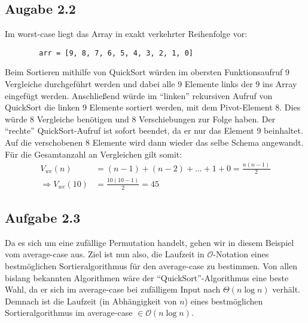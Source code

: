 \documentclass{article}
\begin{document}
    \subsection*{Augabe 2.2}
    Im worst-case liegt das Array in exakt verkehrter Reihenfolge vor:
    \begin{lstlisting}
        arr = [9, 8, 7, 6, 5, 4, 3, 2, 1, 0]
    \end{lstlisting}
    Beim Sortieren mithilfe von QuickSort würden im obersten Funktionsaufruf 9 Vergleiche durchgeführt werden und dabei alle 9 Elemente links der 9 ins Array eingefügt werden. Anschließend würde im "`linken"' rekursiven Aufruf von QuickSort die linken 9 Elemente sortiert werden, mit dem Pivot-Element 8. Dies würde 8 Vergleiche benötigen und 8 Verschiebungen zur Folge haben. Der "`rechte"' QuickSort-Aufruf ist sofort beendet, da er nur das Element 9 beinhaltet. Auf die verschobenen 8 Elemente wird dann wieder das selbe Schema angewandt. Für die Gesamtanzahl an Vergleichen gilt somit:
    \begin{align*}
        V_{wc}(n) &= (n-1) + (n-2) + ... + 1 + 0 = \frac{n(n-1)}{2}\\
        \Rightarrow V_{wc}(10) &= \frac{10(10-1)}{2} = 45
    \end{align*}


    \subsection*{Aufgabe 2.3}
    Da es sich um eine zufällige Permutation handelt, gehen wir in diesem Beispiel vom average-case aus. Ziel ist nun also, die Laufzeit in $\mathcal{O}$-Notation eines bestmöglichen Sortieralgorithmus für den average-case zu bestimmen. Von allen bislang bekannten Algorithmen wäre der "`QuickSort"'-Algorithmus eine beste Wahl, da er sich im average-case bei zufälligem Input nach $\Theta(n \log n)$ verhält. Demnach ist die Laufzeit (in Abhängigkeit von $n$) eines bestmöglichen Sortieralgorithmus im average-case $\in \mathcal{O}(n \log n)$. 
\end{document}
